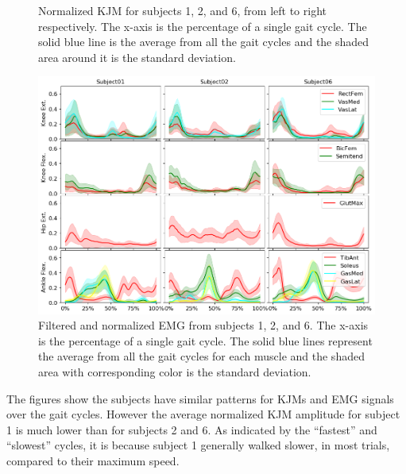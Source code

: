 \documentclass[../main.tex]{subfiles}
\begin{document}
\begin{figure}[ht!]
\begin{subfigure}[b]{0.328\textwidth}
     \end{subfigure}
    \caption{Normalized \ac{KJM} for subjects 1, 2, and 6, from left to right respectively. The x-axis is the percentage of a single gait cycle. The solid blue line is the average from all the gait cycles and the shaded area around it is the standard deviation.}
    \label{fig:kjm-average}
\end{figure}
\begin{figure}[ht!]
    \centering
    \includegraphics[width=\textwidth]{img/results/emg_avg/all_subject_grid_emg_avg.png}
    \caption{Filtered and normalized \ac{EMG} from subjects 1, 2, and 6. The x-axis is the percentage of a single gait cycle. The solid blue lines represent the average from all the gait cycles for each muscle and the shaded area with corresponding color is the standard deviation.}
    \label{fig:emg-average}
\end{figure}
The figures show the subjects have similar patterns for \acp{KJM} and \ac{EMG} signals over the gait cycles.
However the average normalized \ac{KJM} amplitude for subject 1 is much lower than for subjects 2 and 6.
As indicated by the ``fastest'' and ``slowest'' cycles, it is because subject 1 generally walked slower, in most trials, compared to their maximum speed.
\end{document}
